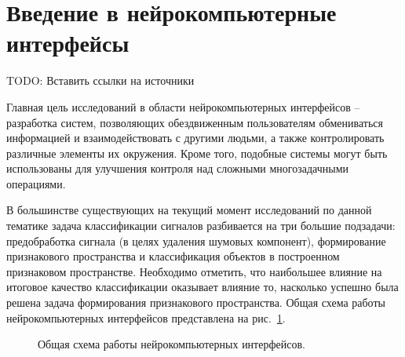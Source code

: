 \documentclass[12pt,fleqn]{article}
\begin{document}
\section{Введение в нейрокомпьютерные интерфейсы}
	\par TODO: Вставить ссылки на источники
	\par Главная цель исследований в области нейрокомпьютерных интерфейсов -- разработка систем, позволяющих обездвиженным пользователям обмениваться информацией и взаимодействовать с другими людьми, а также контролировать различные элементы их окружения. Кроме того, подобные системы могут быть использованы для улучшения контроля над сложными многозадачными операциями.
	\par В большинстве существующих на текущий момент исследований по данной тематике задача классификации сигналов разбивается на три большие подзадачи: предобработка сигнала (в целях удаления шумовых компонент), формирование признакового пространства и классификация объектов в построенном признаковом пространстве. Необходимо отметить, что наибольшее влияние на итоговое качество классификации оказывает влияние то, насколько успешно была решена задача формирования признакового пространства. Общая схема работы нейрокомпьютерных интерфейсов представлена на рис.~\ref{bci}.

	\begin{figure}[H]
	\caption{Общая схема работы нейрокомпьютерных интерфейсов.}
	\label{bci}
	\end{figure}
\end{document}
